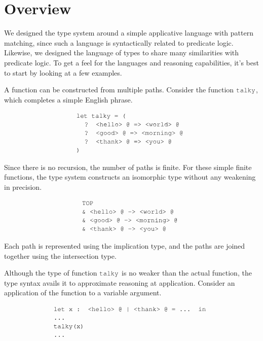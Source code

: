 \documentclass[acmsmall]{acmart}
\theoremstyle{definition}
\begin{document}
\section{Overview}
\label{sec:overview}
We designed the type system around a simple applicative language with pattern matching,
since such a language is syntactically related to predicate logic. Likewise,
we designed the language of types to share many similarities with predicate logic. 
To get a feel for the languages and reasoning capabilities, it's best to start by
looking at a few examples.


A function can be constructed from multiple paths. 
Consider the function $\J{talky}$, which completes a simple English phrase.

\[
  \begin{array}[t]{@{} l}
    \J{let talky = (}
      \\
      \I \J{? <hello> @ => <world> @}
      \\
      \I \J{? <good> @ => <morning> @} 
      \\
      \I \J{? <thank> @ => <you> @} 
      \\
    \J{)}
  \end{array}
\]

Since there is no recursion, the number of paths is finite.
For these simple finite functions, the type system constructs
an isomorphic type without any weakening in precision. 

\[
  \begin{array}[t]{@{} l}
    \J{TOP}
      \\
      \J{\& <hello> @ -> <world> @}
      \\
      \J{\& <good> @ -> <morning> @} 
      \\
      \J{\& <thank> @ -> <you> @} 
  \end{array}
\]

Each path is represented using the implication type,
and the paths are joined together using the intersection type.

Although the type of function $\J{talky}$ is no weaker than the actual function,
the type syntax avails it to approximate reasoning at application.
Consider an application of the function to a variable argument. 

\[
  \begin{array}[t]{@{} l}
    \J{let x : <hello> @ | <thank> @ = ... in}
    \\
    \J{...}
    \\
    \J{talky(x)} 
    \\
    \J{...}
  \end{array}
\]
\end{document}
